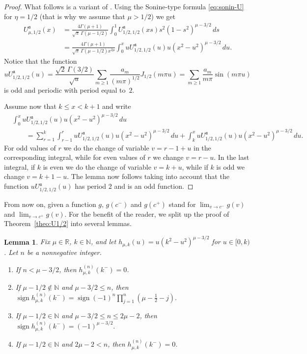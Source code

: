 \documentclass[10pt,a4paper]{article}
\numberwithin{equation}{section}
\theoremstyle{plain}
\newtheorem{Lem}[Theo]{Lemma}
\theoremstyle{definition}
\newcommand{\aA}{\mathfrak{a}}
\newcommand{\RR}{\mathbb{R}}
\newcommand{\NN}{\mathbb{N}}
\newcommand{\sign}{\operatorname{sign}}
\begin{document}
\begin{proof}
What follows is a variant of \cite[\S\,15.2, p.~478]{Wat}.
Using the Sonine-type formula \eqref{eq:sonin-U} for $\eta=1/2$ (that is why we assume that $\mu> 1/2$) we get
\begin{align*}
   U_{\mu,1/2}^{\aA}(x)
   &= \frac{4\Gamma(\mu+1)}{\sqrt{\pi}\,\Gamma(\mu-1/2)}
   \int_0^1 U_{1/2,1/2}^{\aA}(xs) s^{2}(1-s^2)^{\mu-3/2}\,ds
   \\
   &= \frac{4\Gamma(\mu+1)}{\sqrt{\pi}\,\Gamma(\mu-1/2)x^{2\mu}}
   \int_0^x uU_{1/2,1/2}^{\aA}(u) u(x^2-u^2)^{\mu-3/2}\,du.
\end{align*}
Notice that the function
\[
   uU_{1/2,1/2}^{\aA}(u) = \frac{\sqrt{2}\,\Gamma(3/2)}{\sqrt{u}}
   \sum_{m\ge 1} \frac{a_m}{(m\pi)^{1/2}}J_{1/2}(m\pi u)
   = \sum_{m\ge 1}\frac{a_m}{m\pi}\sin(m\pi u)
\]
is odd and periodic with period equal to~$2$.

Assume now that $k\le x< k+1$ and write
\begin{align*}
   &\int_0^x uU_{1/2,1/2}^{\aA}(u)u(x^2-u^2)^{\mu-3/2}\,du
   \\
   &\qquad= \sum_{r=1}^k\int_{r-1}^ruU_{1/2,1/2}^{\aA}(u) u(x^2-u^2)^{\mu-3/2}\,du
   + \int_k^xuU_{1/2,1/2}^{\aA}(u)u(x^2-u^2)^{\mu-3/2}\,du.
\end{align*}
For odd values of $r$ we do the change of variable $v= r-1+u$ in the corresponding integral, while for even values of $r$ we change $v=r-u$. In the last integral, if $k$ is even we do the change of variable $v=k+u$, while if $k$ is odd we change $v=k+1-u$.
The lemma now follows taking into account that the function $uU_{1/2,1/2}^{\aA}(u)$ has period $2$ and is an odd function.
\end{proof}

From now on, given a function $g$, $g(c^-)$ and $g(c^+)$ stand for $\lim_{v\to c^-} g(v)$ and $\lim_{v\to c^+} g(v)$. For the benefit of the reader, we split up the proof of Theorem~\ref{theo:U1/2} into several lemmas.

\begin{Lem}
\label{lem:signoh}
Fix $\mu \in \RR$, $k \in \NN$, and let $h_{\mu,k}(u) = u(k^2 - u^2)^{\mu - 3/2}$ for $u \in [0,k)$. Let $n$ be a nonnegative integer.
\begin{enumerate}
\item[(a)] If $n < \mu - 3/2$, then $h_{\mu,k}^{(n)}(k^-) = 0$.
\item[(b)] If $\mu - 1/2 \notin \NN$ and $\mu - 3/2 \leq n$, then
$
   \sign h_{\mu,k}^{(n)}(k^-)
   = \sign (-1)^n \prod_{j=1}^n (\mu - \tfrac{1}{2} - j).
$
\item[(c)] If $\mu - 1/2 \in \NN$ and $\mu - 3/2 \leq n \leq 2\mu - 2$, then
$
   \sign h_{\mu,k}^{(n)}(k^-)
   = (-1)^{\mu - {3}/{2}}.
$
\item[(d)] If $\mu - 1/2 \in \NN$ and $2\mu - 2 < n$, then $h_{\mu,k}^{(n)}(k^-) = 0$.
\end{enumerate}
\end{Lem}
\end{document}
